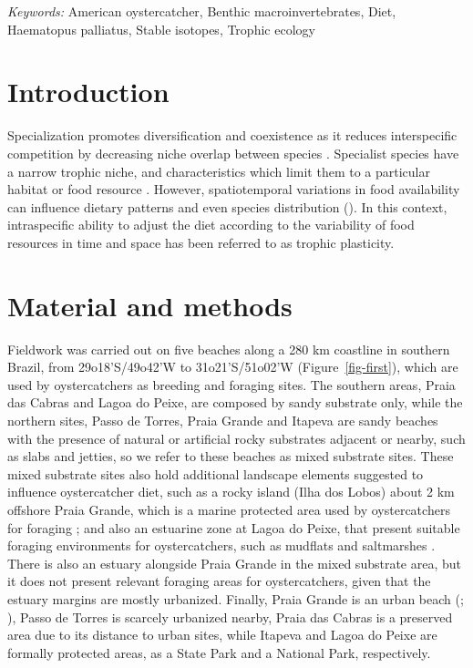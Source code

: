 \documentclass[
  12pt]{article}
\begin{document}
\noindent%
{\it Keywords:} American oystercatcher, Benthic
macroinvertebrates, Diet, Haematopus palliatus, Stable isotopes, Trophic
ecology
\vfill

\newpage
{} %
\ifdefined\Shaded\renewenvironment{Shaded}{\begin{tcolorbox}[interior hidden, breakable, boxrule=0pt, sharp corners, frame hidden, enhanced, borderline west={3pt}{0pt}{shadecolor}]}{\end{tcolorbox}}\fi

\hypertarget{sec-intro}{%
\section{Introduction}\label{sec-intro}}

Specialization promotes diversification and coexistence as it reduces
interspecific competition by decreasing niche overlap between species
\citep{chesson2000mechanisms}. Specialist species have a narrow trophic
niche, and characteristics which limit them to a particular habitat or
food resource \citep{amundsen1996new}. However, spatiotemporal
variations in food availability can influence dietary patterns and even
species distribution (\citep{hughes2000scale}). In this context,
intraspecific ability to adjust the diet according to the variability of
food resources in time and space has been referred to as trophic
plasticity.

\hypertarget{sec-meth}{%
\section{Material and methods}\label{sec-meth}}

Fieldwork was carried out on five beaches along a 280 km coastline in
southern Brazil, from 29o18'S/49o42'W to 31o21'S/51o02'W
(Figure~\ref{fig-first}), which are used by oystercatchers as breeding
and foraging sites. The southern areas, Praia das Cabras and Lagoa do
Peixe, are composed by sandy substrate only, while the northern sites,
Passo de Torres, Praia Grande and Itapeva are sandy beaches with the
presence of natural or artificial rocky substrates adjacent or nearby,
such as slabs and jetties, so we refer to these beaches as mixed
substrate sites. These mixed substrate sites also hold additional
landscape elements suggested to influence oystercatcher diet, such as a
rocky island (Ilha dos Lobos) about 2 km offshore Praia Grande, which is
a marine protected area used by oystercatchers for foraging
\citep{linhares2022american}; and also an estuarine zone at Lagoa do
Peixe, that present suitable foraging environments for oystercatchers,
such as mudflats and saltmarshes \citep{fedrizzi2008distribuiccao}.
There is also an estuary alongside Praia Grande in the mixed substrate
area, but it does not present relevant foraging areas for
oystercatchers, given that the estuary margins are mostly urbanized.
Finally, Praia Grande is an urban beach
(\citet{cristiano2016evaluation}; \citet{linhares2021breeding}), Passo
de Torres is scarcely urbanized nearby, Praia das Cabras is a preserved
area due to its distance to urban sites, while Itapeva and Lagoa do
Peixe are formally protected areas, as a State Park and a National Park,
respectively.
\end{document}
